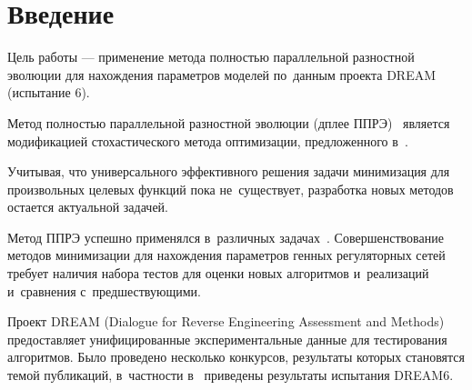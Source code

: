 \chapter*{Введение}							%

Цель работы — применение метода полностью параллельной разностной эволюции для 
нахождения параметров моделей по~данным проекта DREAM (испытание 6).

Метод полностью параллельной разностной эволюции (дплее ППРЭ)~\cite{bib2,bib5} 
является модификацией стохастического метода оптимизации, предложенного 
в~\cite{bib1}. 

Учитывая, что универсального эффективного решения задачи минимизация для 
произвольных целевых функций пока не~существует, разработка новых методов 
остается актуальной задачей. 

Метод ППРЭ успешно применялся в~различных задачах~\cite{bib3,bib4}.
Совершенствование методов минимизации для нахождения параметров генных 
регуляторных сетей требует наличия набора тестов для оценки новых алгоритмов 
и~реализаций и~сравнения с~предшествующими. 

Проект DREAM (Dialogue for Reverse Engineering Assessment and Methods) 
предоставляет унифицированные экспериментальные данные для тестирования 
алгоритмов. Было проведено несколько конкурсов, результаты которых становятся 
темой публикаций, в~частности в~\cite{bib6} приведены результаты испытания 
DREAM6.

\clearpage

